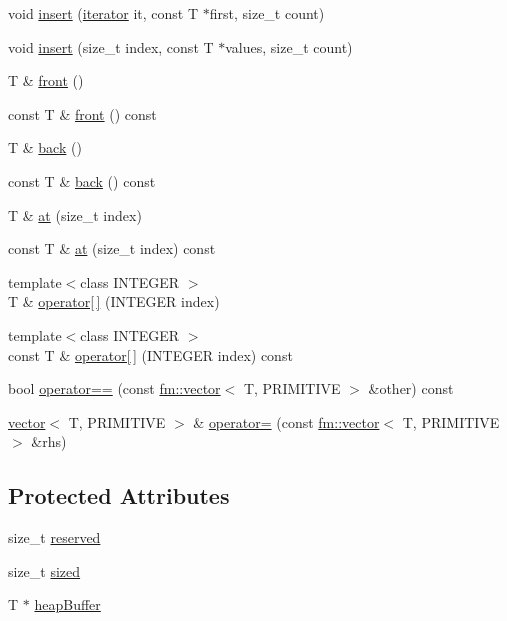 \begin{DoxyCompactItemize}
void \hyperlink{classfm_1_1vector_ab544116bc554e82e17d3df6190510a34}{insert} (\hyperlink{classfm_1_1vector_a45a46984d2c34a4b3a21a8f8532fa213}{iterator} it, const T $\ast$first, size\_\-t count)
\item 
void \hyperlink{classfm_1_1vector_aba41459a3c05540c675667fa3a5414fc}{insert} (size\_\-t index, const T $\ast$values, size\_\-t count)
\item 
T \& \hyperlink{classfm_1_1vector_a98af76f7ca1590bb3476f232034a3cc4}{front} ()
\item 
const T \& \hyperlink{classfm_1_1vector_a0b2b20b3ce8b3e113588f478ad577f87}{front} () const 
\item 
T \& \hyperlink{classfm_1_1vector_a53fc5bae13b2188924ac7a196164dd7f}{back} ()
\item 
const T \& \hyperlink{classfm_1_1vector_a775d2ac16f568c848ce2cd7da19e3a99}{back} () const 
\item 
T \& \hyperlink{classfm_1_1vector_ad87eec5a8d64e3c771ba33a31e08729b}{at} (size\_\-t index)
\item 
const T \& \hyperlink{classfm_1_1vector_a4ca996541e83abdd0b77e6ee2803b9ca}{at} (size\_\-t index) const 
\item 
{\footnotesize template$<$class INTEGER $>$ }\\T \& \hyperlink{classfm_1_1vector_a77cb642314e7e440fa2db3b31db32777}{operator\mbox{[}$\,$\mbox{]}} (INTEGER index)
\item 
{\footnotesize template$<$class INTEGER $>$ }\\const T \& \hyperlink{classfm_1_1vector_a03125d949b5f5a74b2133bb11aba8638}{operator\mbox{[}$\,$\mbox{]}} (INTEGER index) const 
\item 
bool \hyperlink{classfm_1_1vector_a1b43694349d1aae92c6b627aa1d72da3}{operator==} (const \hyperlink{classfm_1_1vector}{fm::vector}$<$ T, PRIMITIVE $>$ \&other) const 
\item 
\hyperlink{classfm_1_1vector}{vector}$<$ T, PRIMITIVE $>$ \& \hyperlink{classfm_1_1vector_a829b35acd78303ccfb59decf65c11fa0}{operator=} (const \hyperlink{classfm_1_1vector}{fm::vector}$<$ T, PRIMITIVE $>$ \&rhs)
\end{DoxyCompactItemize}
\subsection*{Protected Attributes}
\begin{DoxyCompactItemize}
\item 
size\_\-t \hyperlink{classfm_1_1vector_ac0e612b5f0f159b22f93c9f9bb37b722}{reserved}
\item 
size\_\-t \hyperlink{classfm_1_1vector_af23c511dc075041959151b7bd02a214d}{sized}
\item 
T $\ast$ \hyperlink{classfm_1_1vector_a04d2e3a1f69f87fc9024f4f96a145cb6}{heapBuffer}
\end{DoxyCompactItemize}


